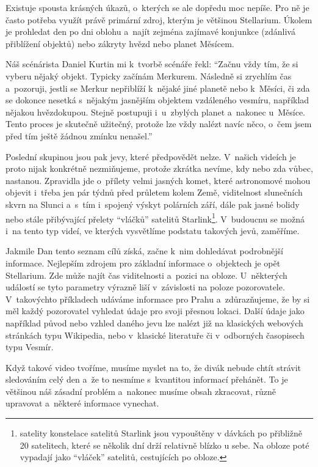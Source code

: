 \documentclass[12pt,a4paper,titlepage]{article}
\begin{document}
Existuje spousta krásných úkazů, o~kterých se ale dopředu moc nepíše. Pro ně je často potřeba využít právě primární zdroj, kterým je většinou Stellarium. Úkolem je prohledat den po dni oblohu a~najít zejména zajímavé konjunkce (zdánlivá přiblížení objektů) nebo zákryty hvězd nebo planet Měsícem.\@ 

Náš scénárista Daniel Kurtin mi k~tvorbě scénáře řekl: \enquote{Začnu vždy tím, že si vyberu nějaký objekt. Typicky začínám Merkurem. Následně si zrychlím čas a~pozoruji, jestli se Merkur nepřiblíží k~nějaké jiné planetě nebo k~Měsíci, či zda se dokonce nesetká s~nějakým jasnějším objektem vzdáleného vesmíru, například nějakou hvězdokupou. Stejně postupuji i~u~zbylých planet a~nakonec u~Měsíce. Tento proces je skutečně užitečný, protože lze vždy nalézt navíc něco, o~čem jsem před tím ještě žádnou zmínku nenašel.}

Poslední skupinou jsou pak jevy, které předpovědět nelze. V~našich videích je proto nijak konkrétně nezmiňujeme, protože zkrátka nevíme, kdy nebo zda vůbec, nastanou. Zpravidla jde o~přílety velmi jasných komet, které astronomové mohou objevit i~třeba jen pár týdnů před průletem kolem Země,  viditelnost slunečních skvrn na Slunci a~s~tím i~spojený výskyt polárních září, dále pak jasné bolidy nebo stále přibývající přelety \enquote{vláčků} satelitů Starlink\footnote{satelity konstelace satelitů Starlink jsou vypouštěny v dávkách po přibližně 20 satelitech, které se několik dní drží relativně blízko u sebe. Na obloze poté vypadají jako \enquote{vláček} satelitů, cestujících po obloze.}. V~budoucnu se možná i~na tento typ videí, ve kterých vysvětlíme podstatu takových jevů, zaměříme. 

Jakmile Dan tento seznam cílů získá, začne k~nim dohledávat podrobnější informace. Nejlepším zdrojem pro základní informace o~objektech je opět Stellarium. Zde může najít čas viditelnosti a~pozici na obloze. U~některých událostí se tyto parametry výrazně liší v~závislosti na poloze pozorovatele. V~takovýchto příkladech udáváme informace pro Prahu a~zdůrazňujeme, že by si měl každý pozorovatel vyhledat údaje pro svoji přesnou lokaci. Další údaje jako například původ nebo vzhled daného jevu lze nalézt již na klasických webových stránkách typu Wikipedia, nebo v~klasické literatuře či v~odborných časopisech typu Vesmír.

Když takové video tvoříme, musíme myslet na to, že divák nebude chtít strávit sledováním celý den a~že to nesmíme s~kvantitou informací přehánět. To je většinou náš zásadní problém a~nakonec musíme obsah zkracovat, různě upravovat a~některé informace vynechat. 
\end{document}
